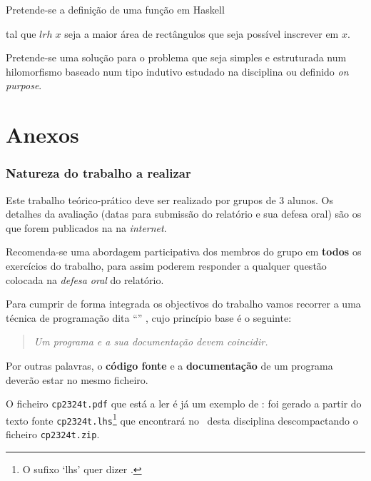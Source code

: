 \documentclass[11pt, a4paper, fleqn]{article}
\newcommand{\Conid}[1]{\mathit{#1}}
\newcommand{\Varid}[1]{\mathit{#1}}
\def\resethooks{%
  \global\let\SaveRestoreHook\empty
  \global\let\ColumnHook\empty}
\let\hspre\empty
\let\hspost\empty
\begin{document}
Pretende-se a definição de uma função em Haskell
\resethooks
tal que \ensuremath{\Varid{lrh}\;\Varid{x}} seja a maior área de rectângulos que seja possível inscrever em \ensuremath{\Varid{x}}.

Pretende-se uma solução para o problema que seja simples e estruturada num hilomorfismo baseado num tipo indutivo estudado na disciplina ou definido \emph{on purpose}.

\newpage
\part*{Anexos}

\appendix

\section{Natureza do trabalho a realizar}
\label{sec:documentacao}
Este trabalho teórico-prático deve ser realizado por grupos de 3 alunos.
Os detalhes da avaliação (datas para submissão do relatório e sua defesa
oral) são os que forem publicados na  na \emph{internet}.

Recomenda-se uma abordagem participativa dos membros do grupo em \textbf{todos}
os exercícios do trabalho, para assim poderem responder a qualquer questão
colocada na \emph{defesa oral} do relatório.

Para cumprir de forma integrada os objectivos do trabalho vamos recorrer
a uma técnica de programa\-ção dita ``'' \cite{Kn92}, cujo
princípio base é o seguinte:
%
\begin{quote}\em
	Um programa e a sua documentação devem coincidir.
\end{quote}
%
Por outras palavras, o \textbf{código fonte} e a \textbf{documentação} de um
programa deverão estar no mesmo ficheiro.

O ficheiro \texttt{cp2324t.pdf} que está a ler é já um exemplo de
: foi gerado a partir do texto fonte
\texttt{cp2324t.lhs}\footnote{O sufixo `lhs' quer dizer
\emph{}.} que encontrará no \MaterialPedagogico\
desta disciplina des\-com\-pactando o ficheiro \texttt{cp2324t.zip}.
\end{document}

